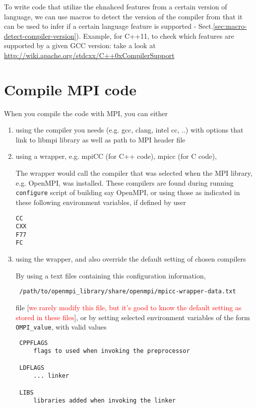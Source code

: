 To write code that utilize the ehnahced features from a certain version of
language, we can use macros to detect the version of the compiler from that
it can be used to infer if a certain language feature is supported -
Sect.\ref{sec:macro-detect-compiler-version}). 
Example, for C++11, to check which features are supported by a given GCC
version: take a look at
\url{http://wiki.apache.org/stdcxx/C++0xCompilerSupport}




\section{Compile MPI code}

When you compile the code with MPI, you can either
\begin{enumerate}
  \item  using the compiler you needs
(e.g. gcc, clang, intel cc, ..) with options that link to libmpi library as well
as path to MPI header file

  \item using a wrapper, e.g. mpiCC (for C++ code), mpicc (for C code), 
  
 The wrapper would call the compiler that was selected when the MPI library,
 e.g. OpenMPI, was installed. These compilers are found during running \verb!configure! script of building say OpenMPI, or
 using those as indicated in these following environment variables, if defined by user
 
\begin{verbatim}
CC
CXX
F77
FC
\end{verbatim}
  
 \item using the wrapper, and also override the default setting of chosen compilers
 
 By using a text files containing this configuration information,
 \begin{verbatim}
 /path/to/openmpi_library/share/openmpi/mpicc-wrapper-data.txt
 \end{verbatim}
 file  [\textcolor{red}{we rarely modify this file, but it's good to know the default setting as stored in these files}],  
 or by setting selected environment variables of the form
 \verb!OMPI_value!, with valid values \begin{verbatim}
 CPPFLAGS
     flags to used when invoking the preprocessor
     
 LDFLAGS
     ... linker 
 
 LIBS
     libraries added when invoking the linker
 

\end{verbatim}
\end{enumerate}
